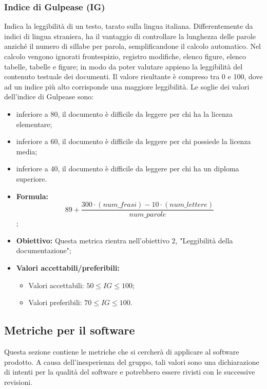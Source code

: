 \subsubsection{Indice di Gulpease (IG)}
Indica la leggibilità di un testo, tarato sulla lingua italiana. Differentemente da indici di lingua straniera, ha il vantaggio di controllare la lunghezza delle parole anziché il numero di sillabe per parola, semplificandone il calcolo automatico.
Nel calcolo vengono ignorati frontespizio, registro modifiche, elenco figure, elenco tabelle, tabelle e figure; in modo da poter valutare appieno la leggibilità del contenuto testuale dei documenti.
Il valore risultante è compreso tra 0 e 100, dove ad un indice più alto corrisponde una maggiore leggibilità.
Le soglie dei valori dell'indice di Gulpease sono:
\begin{itemize}
    \item inferiore a 80, il documento è difficile da leggere per chi ha la licenza elementare;
    \item inferiore a 60, il documento è difficile da leggere per chi possiede la licenza media;
    \item inferiore a 40, il documento è difficile da leggere per chi ha un diploma superiore.
\end{itemize}
\begin{itemize}
	\item \textbf{Formula:}\[
	89+ \frac{300\cdot (num\_frasi) - 10\cdot (num\_lettere)}{num\_parole}
	\];
	\item \textbf{Obiettivo:} Questa metrica rientra nell'obiettivo 2, "Leggibilità della documentazione";
	\item \textbf{Valori accettabili/preferibili: }
	\begin{itemize}
		\item Valori accettabili: $50 \leq IG \leq 100$;
		\item Valori preferibili: $70 \leq IG \leq 100$.
	\end{itemize}
\end{itemize}


\subsection{Metriche per il software}
Questa sezione contiene le metriche che si cercherà di applicare al software prodotto. A causa dell'inesperienza del gruppo, tali valori sono una dichiarazione di intenti per la qualità del software e potrebbero essere rivisti con le successive revisioni.

